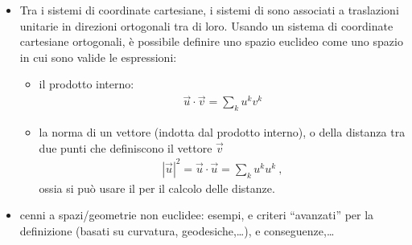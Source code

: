 \documentclass[letterpaper,10pt,english]{jupyterBook}
\begin{document}
\begin{itemize}
\item {} 
\sphinxAtStartPar
Tra i sistemi di coordinate cartesiane, i sistemi di  sono associati a traslazioni unitarie in direzioni ortogonali tra di loro. Usando un sistema di coordinate cartesiane ortogonali, è possibile definire uno spazio euclideo come uno spazio in cui sono valide le espressioni:
\begin{itemize}
\item {} 
\sphinxAtStartPar
il prodotto interno:
\begin{equation*}
\begin{split}\vec{u} \cdot \vec{v} = \sum_k u^k v^k\end{split}
\end{equation*}
\item {} 
\sphinxAtStartPar
la norma di un vettore (indotta dal prodotto interno), o della distanza tra due punti che definiscono il vettore \(\vec{v}\)
\begin{equation*}
\begin{split}|\vec{u}|^2 = \vec{u} \cdot \vec{u} = \sum_k u^k u^k \ ,\end{split}
\end{equation*}
\sphinxAtStartPar
ossia si può usare il  per il calcolo delle distanze.

\end{itemize}

\item {} 
\sphinxAtStartPar
{} cenni a spazi/geometrie non euclidee: esempi, e criteri “avanzati” per la definizione (basati su curvatura, geodesiche,…), e conseguenze,…

\end{itemize}

\sphinxstepscope
\end{document}
